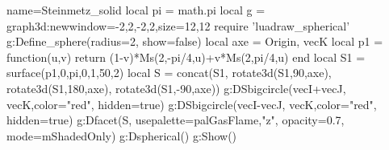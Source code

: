 \documentclass[border=5pt]{standalone}
\begin{document}
\begin{luadraw}{name=Steinmetz_solid}
local pi = math.pi
local g = graph3d:new{window={-2,2,-2,2},size={12,12}}
require 'luadraw_spherical'
g:Define_sphere({radius=2, show=false})
local axe = {Origin, vecK}
local p1 = function(u,v) return (1-v)*Ms(2,-pi/4,u)+v*Ms(2,pi/4,u) end
local S1 = surface(p1,0,pi,0,1,{50,2})
local S = concat(S1, rotate3d(S1,90,axe), rotate3d(S1,180,axe), rotate3d(S1,-90,axe))
g:DSbigcircle({vecI+vecJ, vecK},{color="red", hidden=true})
g:DSbigcircle({vecI-vecJ, vecK},{color="red", hidden=true})
g:Dfacet(S, {usepalette={palGasFlame,"z"}, opacity=0.7, mode=mShadedOnly})
g:Dspherical()
g:Show()
\end{luadraw}
\end{document}
